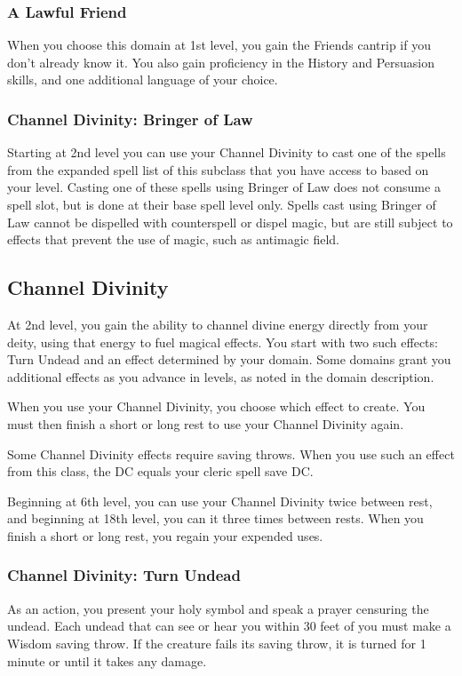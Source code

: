 \documentclass[letterpaper,openany,oneside,twocolumn]{book}
\begin{document}
\subsubsection*{A Lawful Friend}
When you choose this domain at 1st level, you gain the Friends cantrip if you don't already know it. You also gain proficiency in the History and Persuasion skills, and one additional language of your choice.
\subsubsection*{Channel Divinity: Bringer of Law}
Starting at 2nd level you can use your Channel Divinity to cast one of the spells from the expanded spell list of this subclass that you have access to based on your level. Casting one of these spells using Bringer of Law does not consume a spell slot, but is done at their base spell level only. Spells cast using Bringer of Law cannot be dispelled with counterspell or dispel magic, but are still subject to effects that prevent the use of magic, such as antimagic field.

\subsection*{Channel Divinity}
At 2nd level, you gain the ability to channel divine energy directly from your deity, using that energy to fuel magical effects. You start with two such effects: Turn Undead and an effect determined by your domain. Some domains grant you additional effects as you advance in levels, as noted in the domain description.

When you use your Channel Divinity, you choose which effect to create. You must then finish a short or long rest to use your Channel Divinity again.

Some Channel Divinity effects require saving throws. When you use such an effect from this class, the DC equals your cleric spell save DC.

Beginning at 6th level, you can use your Channel Divinity twice between rest, and beginning at 18th level, you can it three times between rests. When you finish a short or long rest, you regain your expended uses.
\subsubsection*{Channel Divinity: Turn Undead}
As an action, you present your holy symbol and speak a prayer censuring the undead. Each undead that can see or hear you within 30 feet of you must make a Wisdom saving throw. If the creature fails its saving throw, it is turned for 1 minute or until it takes any damage.
\end{document}
